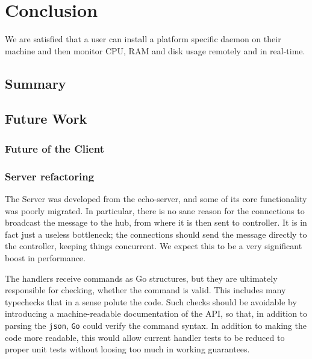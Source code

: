 \documentclass{l3proj}
\begin{document}
\chapter{Conclusion}

We are satisfied that a user can install a platform specific daemon on their machine and then monitor CPU, RAM and disk usage remotely and in real-time.


\section{Summary}


\section{Future Work}

\subsection{Future of the Client}

\subsection{Server refactoring}

The Server was developed from the echo-server, and some of its core functionality was poorly migrated. In particular, there is no sane reason for the connections to broadcast the message to the hub, from where it is then sent to controller. It is in fact just a useless bottleneck; the connections should send the message directly to the controller, keeping things concurrent. We expect this to be a very significant boost in performance.

The handlers receive commands as Go structures, but they are ultimately responsible for checking, whether the command is valid. This includes many typechecks that in a sense polute the code. Such checks should be avoidable by introducing a machine-readable documentation of the API, so that, in addition to parsing the \texttt{json}, \texttt{Go} could verify the command syntax. In addition to making the code more readable, this would allow current handler tests to be reduced to proper unit tests without loosing too much in working guarantees.
\end{document}
